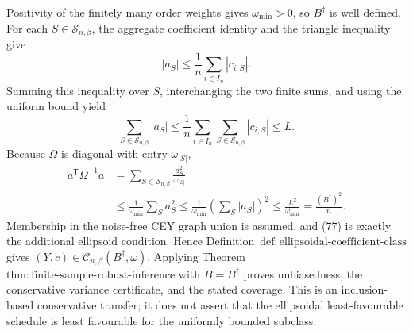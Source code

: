 Positivity of the finitely many order weights gives \(\omega_{\min}>0\), so \(B^\dagger\) is well defined.  For each \(S\in\mathcal S_{n,\beta}\), the aggregate coefficient identity and the triangle inequality give
\[
|a_S|\le\frac1n\sum_{i\in I_n}|c_{i,S}|.
\]
Summing this inequality over \(S\), interchanging the two finite sums, and using the uniform bound yield
\[
\sum_{S\in\mathcal S_{n,\beta}}|a_S|
\le\frac1n\sum_{i\in I_n}\sum_{S\in\mathcal S_{n,\beta}}|c_{i,S}|
\le L.
\tag{76}
\]
Because \(\Omega\) is diagonal with entry \(\omega_{|S|}\),
\[
\begin{aligned}
a^{\mathsf T}\Omega^{-1}a
&=\sum_{S\in\mathcal S_{n,\beta}}\frac{a_S^2}{\omega_{|S|}}\\
&\le\frac1{\omega_{\min}}\sum_Sa_S^2
\le\frac1{\omega_{\min}}\left(\sum_S|a_S|\right)^2
\le\frac{L^2}{\omega_{\min}}
=\frac{(B^\dagger)^2}{n}.
\end{aligned}
\tag{77}
\]
Membership in the noise-free CEY graph union is assumed, and (77) is exactly the additional ellipsoid condition.  Hence Definition~\(\mathrm{def{:}ellipsoidal\text{-}coefficient\text{-}class}\) gives \((Y,c)\in\mathcal C_{n,\beta}(B^\dagger,\omega)\).  Applying Theorem~\(\mathrm{thm{:}finite\text{-}sample\text{-}robust\text{-}inference}\) with \(B=B^\dagger\) proves unbiasedness, the conservative variance certificate, and the stated coverage.  This is an inclusion-based conservative transfer; it does not assert that the ellipsoidal least-favourable schedule is least favourable for the uniformly bounded subclass.